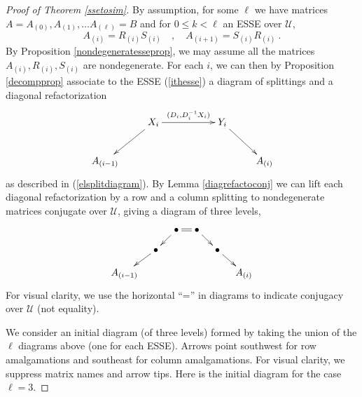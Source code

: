 \documentclass{amsart}
\theoremstyle{definition}
\theoremstyle{remark}
\numberwithin{equation}{section}
\begin{document}
{{\begin{proof}[Proof of Theorem 
\ref{ssetosim}] 
By assumption, for some $\ell$  we have 
 matrices 
\newline 
$A=A_{(0)},A_{(1)},\dots A_{(\ell )}=B$
and for $0\leq k<\ell $ an ESSE over  $\mathcal U$, 
\begin{equation} \label{ithesse}
A_{(i)}=R_{(i)}S_{(i)} \quad , \quad A_{(i+1)}=S_{(i)}R_{(i)}  \ . 
\end{equation} 
By Proposition \ref{nondegeneratesseprop}, we may assume all the 
matrices $A_{(i)},R_{(i)},S_{(i)}$ are nondegenerate. 
For each $i$, we can then 
by Proposition 
\ref{decompprop} 
 associate to the ESSE (\ref{ithesse}) a diagram of splittings 
and a diagonal refactorization 
\begin{equation} \label{diagram1} 
\xymatrix{ 
       & X_i \ar[rr]^-{(D_i, D_i^{-1}X_i)} 
\ar[dl]   &  & Y_i\ar[dr]  &     \\ 
A_{(i-1)}      &                                          &  
&                   &  A_{(i)} 
}
\end{equation}
 as described in 
(\ref{elsplitdiagram}). By  Lemma \ref{diagrefactoconj}  
we can lift each diagonal refactorization by a row and a column 
splitting to nondegenerate matrices conjugate over $\mathcal U$, giving a diagram 
of three levels, 
\begin{equation}
\xymatrix@=10pt{ 
    &                        & \bullet  \ar[dl] \ar@{=}[r] & \bullet \ar[dr] &                & \\
    & \bullet        \ar[dl] &                             &               & \bullet \ar[dr] &  \\
A_{(i-1)} &                    &                             &               &                 &   A_{(i)}}
\end{equation} 
For visual clarity, we use the horizontal 
 ``=''  in diagrams to indicate conjugacy over $\mathcal U$ (not equality). 

We consider an initial diagram 
(of three levels) formed by taking the union of the $\ell$ diagrams above
 (one for each ESSE). 
Arrows point southwest for row amalgamations and southeast 
for column amalgamations. 
For visual clarity, we suppress matrix names and arrow tips.
 Here is the initial diagram for 
the case $\ell =3$. 



\end{proof}}}
\end{document}

